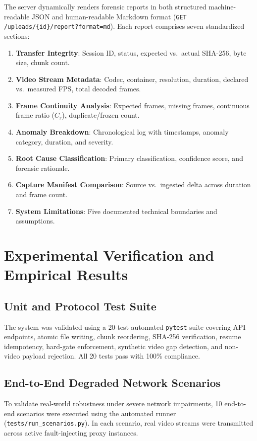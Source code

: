 \documentclass[11pt,a4paper]{article}
\begin{document}
The server dynamically renders forensic reports in both structured machine-readable JSON and human-readable Markdown format (\texttt{GET /uploads/\{id\}/report?format=md}). Each report comprises seven standardized sections:
\begin{enumerate}[leftmargin=*,itemsep=1pt]
    \item \textbf{Transfer Integrity}: Session ID, status, expected vs.\ actual SHA-256, byte size, chunk count.
    \item \textbf{Video Stream Metadata}: Codec, container, resolution, duration, declared vs.\ measured FPS, total decoded frames.
    \item \textbf{Frame Continuity Analysis}: Expected frames, missing frames, continuous frame ratio ($C_r$), duplicate/frozen count.
    \item \textbf{Anomaly Breakdown}: Chronological log with timestamps, anomaly category, duration, and severity.
    \item \textbf{Root Cause Classification}: Primary classification, confidence score, and forensic rationale.
    \item \textbf{Capture Manifest Comparison}: Source vs.\ ingested delta across duration and frame count.
    \item \textbf{System Limitations}: Five documented technical boundaries and assumptions.
\end{enumerate}

\section{Experimental Verification and Empirical Results}

\subsection{Unit and Protocol Test Suite}
The system was validated using a 20-test automated \texttt{pytest} suite covering API endpoints, atomic file writing, chunk reordering, SHA-256 verification, resume idempotency, hard-gate enforcement, synthetic video gap detection, and non-video payload rejection. All 20 tests pass with 100\% compliance.

\subsection{End-to-End Degraded Network Scenarios}
To validate real-world robustness under severe network impairments, 10 end-to-end scenarios were executed using the automated runner (\texttt{tests/run\_scenarios.py}). In each scenario, real video streams were transmitted across active fault-injecting proxy instances.
\end{document}
